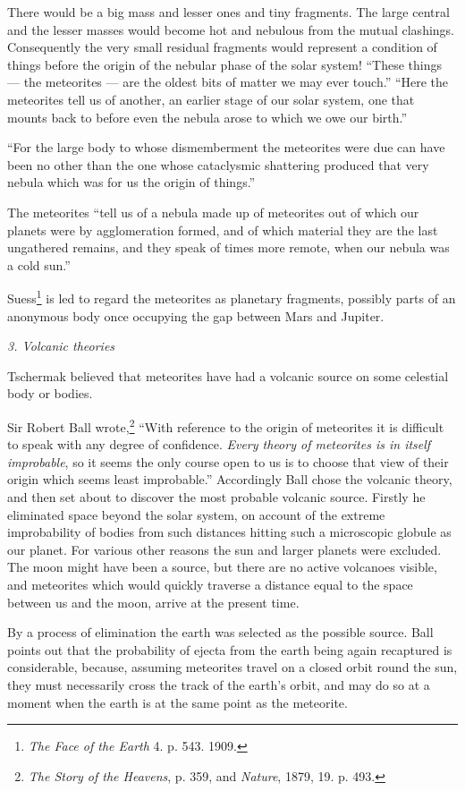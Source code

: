 \documentclass[a4paper, 12pt, oneside]{article}
\begin{document}
There would be a big mass and lesser ones and tiny fragments. The large central and the lesser masses would become hot and nebulous from the mutual clashings. Consequently the very small residual fragments would represent a condition of things before the origin of the nebular phase of the solar system! ``These things --- the meteorites --- are the oldest bits of matter we may ever touch.'' ``Here the meteorites tell us of another, an earlier stage of our solar system, one that mounts back to before even the nebula arose to which we owe our birth.''

``For the large body to whose dismemberment the meteorites were due can have been no other than the one whose cataclysmic shattering produced that very nebula which was for us the origin of things.''

The meteorites ``tell us of a nebula made up of meteorites out of which our planets were by agglomeration formed, and of which material they are the last ungathered remains, and they speak of times more remote, when our nebula was a cold sun.''

Suess\footnote{\emph{The Face of the Earth} 4. p. 543. 1909.} is led to regard the meteorites as planetary fragments, possibly parts of an anonymous body once occupying the gap between Mars and Jupiter.

\bigskip
\centerline{\emph{3. Volcanic theories}}

Tschermak believed that meteorites have had a volcanic source on some celestial body or bodies.

Sir Robert Ball wrote,\footnote{\emph{The Story of the Heavens}, p. 359, and \emph{Nature}, 1879, 19. p. 493.} ``With reference to the origin of meteorites it is difficult to speak with any degree of confidence. \emph{Every theory of meteorites is in itself improbable}, so it seems the only course open to us is to choose that view of their origin which seems least improbable.'' Accordingly Ball chose the volcanic theory, and then set about to discover the most probable volcanic source. Firstly he eliminated space beyond the solar system, on account of the extreme improbability of bodies from such distances hitting such a microscopic globule as our planet. For various other reasons the sun and larger planets were excluded. The moon might have been a source, but there are no active volcanoes visible, and meteorites which would quickly traverse a distance equal to the space between us and the moon, arrive at the present time.

By a process of elimination the earth was selected as the possible source. Ball points out that the probability of ejecta from the earth being again recaptured is considerable, because, assuming meteorites travel on a closed orbit round the sun, they must necessarily cross the track of the earth's orbit, and may do so at a moment when the earth is at the same point as the meteorite.
\end{document}
